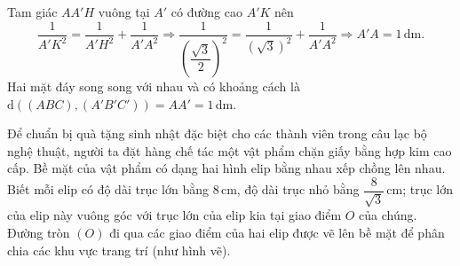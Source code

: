 \begin{ex}
{{\begin{tikzpicture}[scale=0.9, >=stealth]
			\end{tikzpicture}
		}
		\noindent Tam giác $AA'H$ vuông tại $A'$ có đường cao $A'K$ nên
		\[\dfrac{1}{A'K^2} = \dfrac{1}{A'H^2} + \dfrac{1}{A'A^2} \Rightarrow \dfrac{1}{\left(\dfrac{\sqrt{3}}{2}\right)^2} = \dfrac{1}{(\sqrt{3})^2} + \dfrac{1}{A'A^2} \Rightarrow A'A = 1\,\text{dm}.\]
		Hai mặt đáy song song với nhau và có khoảng cách là $\mathrm{d}((ABC), (A'B'C')) = AA' = 1\,$dm.
	}
\end{ex}
\begin{ex}%
	Để chuẩn bị quà tặng sinh nhật đặc biệt cho các thành viên trong câu lạc bộ nghệ thuật, người ta đặt hàng chế tác một vật phẩm chặn giấy bằng hợp kim cao cấp. Bề mặt của vật phẩm có dạng hai hình elip bằng nhau xếp chồng lên nhau. Biết mỗi elip có độ dài trục lớn bằng $8\,$cm, độ dài trục nhỏ bằng $\dfrac{8}{\sqrt{3}}\,$cm; trục lớn của elip này vuông góc với trục lớn của elip kia tại giao điểm $O$ của chúng. Đường tròn $(O)$ đi qua các giao điểm của hai elip được vẽ lên bề mặt để phân chia các khu vực trang trí (như hình vẽ). 
\end{ex}
